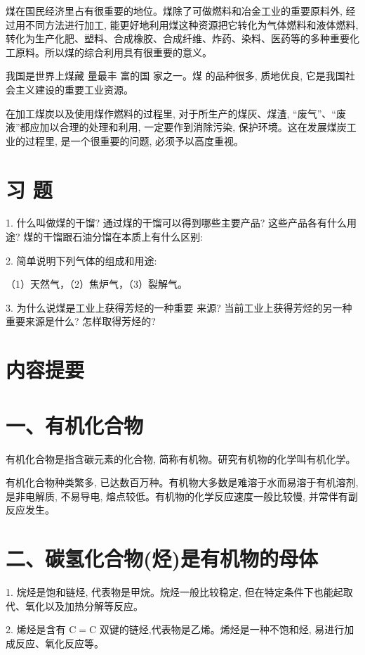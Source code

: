 \documentclass[10pt]{article}
\begin{document}
煤在国民经济里占有很重要的地位。煤除了可做燃料和冶金工业的重要原料外, 经过用不同方法进行加工, 能更好地利用煤这种资源把它转化为气体燃料和液体燃料, 转化为生产化肥、塑料、合成橡胶、合成纤维、炸药、染料、医药等的多种重要化工原料。所以煤的综合利用具有很重要的意义。

我国是世界上煤藏 量最丰 富的国 家之一。煤 的品种很多, 质地优良, 它是我国社会主义建设的重要工业资源。

在加工煤炭以及使用煤作燃料的过程里, 对于所生产的煤灰、煤渣, “废气”、“废液”都应加以合理的处理和利用, 一定要作到消除污染, 保护环境。这在发展煤炭工业的过程里, 是一个很重要的问题, 必须予以高度重视。

\section*{习 题}

1. 什么叫做煤的干馏? 通过煤的干馏可以得到哪些主要产品? 这些产品各有什么用途? 煤的干馏跟石油分馏在本质上有什么区别:

2. 简单说明下列气体的组成和用途:

（1）天然气，（2）焦炉气，（3）裂解气。

3. 为什么说煤是工业上获得芳烃的一种重要 来源? 当前工业上获得芳烃的另一种重要来源是什么? 怎样取得芳烃的?

\section*{内容提要}

\section*{一、有机化合物}

有机化合物是指含碳元素的化合物, 简称有机物。研究有机物的化学叫有机化学。

有机化合物种类繁多, 已达数百万种。有机物大多数是难溶于水而易溶于有机溶剂, 是非电解质, 不易导电, 熔点较低。有机物的化学反应速度一般比较慢, 并常伴有副反应发生。

\section*{二、碳氢化合物(烃)是有机物的母体}

1. 烷烃是饱和链烃, 代表物是甲烷。烷烃一般比较稳定, 但在特定条件下也能起取代、氧化以及加热分解等反应。

2. 烯烃是含有 \(\mathrm{C} = \mathrm{C}\) 双键的链烃,代表物是乙烯。烯烃是一种不饱和烃, 易进行加成反应、氧化反应等。
\end{document}
